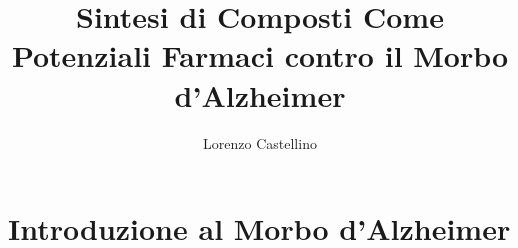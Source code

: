 \documentclass{article}
\title{Sintesi di Composti Come Potenziali Farmaci contro il Morbo d'Alzheimer}
\author{Lorenzo Castellino}
\begin{document}
\maketitle
\newpage
{}
\tableofcontents
\newpage
\section{Introduzione al Morbo d'Alzheimer}
\end{document}
